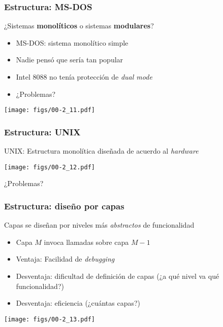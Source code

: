\documentclass[letter]{beamer}
\begin{document}
\begin{frame}
  \frametitle{Estructura: MS-DOS}
  
  ¿Sistemas {\bf monolíticos} o sistemas {\bf modulares}?
  
  \begin{itemize}
    \item<3-> MS-DOS: sistema monolítico simple
    \item<3-> Nadie pensó que sería tan popular
    \item<3-> Intel 8088 no tenía protección de {\em dual mode}
    \item<3-> ¿Problemas? 
  \end{itemize}
  
  \begin{center}
    \texttt{[image: figs/00-2\_11.pdf]}
  \end{center}
  
  
\end{frame}

\begin{frame}
  \frametitle{Estructura: UNIX}

  UNIX: Estructura monolítica diseñada de acuerdo al {\em hardware}
  
  \begin{center}
    \texttt{[image: figs/00-2\_12.pdf]}
  \end{center}

  ¿Problemas? 
\end{frame}

\begin{frame}
  \frametitle{Estructura: diseño por capas}

  Capas se diseñan por niveles más {\em abstractos} de funcionalidad
  
  \begin{itemize}
    \item Capa $M$ invoca llamadas sobre capa $M-1$
    \item<2-> Ventaja: Facilidad de {\em debugging}
    \item<3-> Desventaja: dificultad de definición de capas (¿a qué nivel va qué funcionalidad?)
    \item<3-> Desventaja: eficiencia (¿cuántas capas?)
  \end{itemize}
  
  \begin{center}
    \texttt{[image: figs/00-2\_13.pdf]}
  \end{center}

\end{frame}
\end{document}
